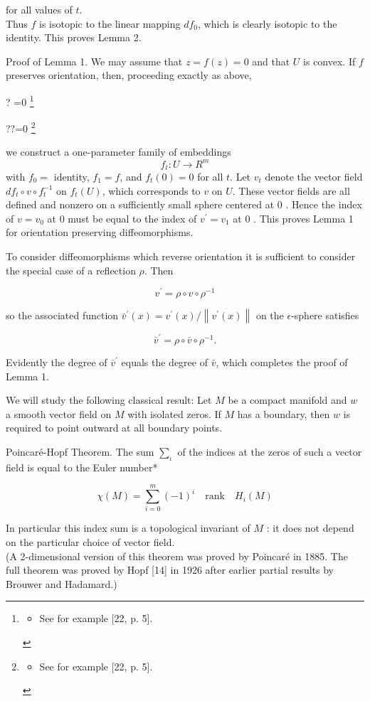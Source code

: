 \documentclass[10pt, letterpaper]{article}
\let\svthefootnote\thefootnote
\newcommand\blfootnotetext[1]{%
  \let\thefootnote\relax\footnote{#1}%
  \addtocounter{footnote}{-1}%
  \let\thefootnote\svthefootnote%
}
\let\svfootnotetext\footnotetext
\renewcommand\footnotetext[2][?]{%
  \if\relax#1\relax%
    \ifnum\value{footnote}=0\blfootnotetext{#2}\else\svfootnotetext{#2}\fi%
  \else%
    \if?#1\ifnum\value{footnote}=0\blfootnotetext{#2}\else\svfootnotetext{#2}\fi%
    \else\svfootnotetext[#1]{#2}\fi%
  \fi
}
\begin{document}
for all values of $t$.\\
Thus $f$ is isotopic to the linear mapping $d f_{0}$, which is clearly isotopic to the identity. This proves Lemma 2.

Proof of Lemma 1. We may assume that $z=f(z)=0$ and that $U$ is convex. If $f$ preserves orientation, then, proceeding exactly as above,

\footnotetext{\begin{itemize}
  \item See for example [22, p. 5].
\end{itemize}
}
we construct a one-parameter family of embeddings
$$
f_{t}: U \rightarrow R^{m}
$$
with $f_{0}=$ identity, $f_{1}=f$, and $f_{t}(0)=0$ for all $t$. Let $v_{t}$ denote the vector field $d f_{t} \circ v \circ f_{t}^{-1}$ on $f_{t}(U)$, which corresponds to $v$ on $U$. These vector fields are all defined and nonzero on a sufficiently small sphere centered at 0 . Hence the index of $v=v_{0}$ at 0 must be equal to the index of $v^{\prime}=v_{1}$ at 0 . This proves Lemma 1 for orientation preserving diffeomorphisms.

To consider diffeomorphisms which reverse orientation it is sufficient to consider the special case of a reflection $\rho$. Then

$$
v^{\prime}=\rho \circ v \circ \rho^{-1}
$$

so the associated function $\bar{v}^{\prime}(x)=v^{\prime}(x) /\left\|v^{\prime}(x)\right\|$ on the $\epsilon$-sphere satisfies

$$
\bar{v}^{\prime}=\rho \circ \bar{v} \circ \rho^{-1} .
$$

Evidently the degree of $\bar{v}^{\prime}$ equals the degree of $\bar{v}$, which completes the proof of Lemma 1.

We will study the following classical result: Let $M$ be a compact manifold and $w$ a smooth vector field on $M$ with isolated zeros. If $M$ has a boundary, then $w$ is required to point outward at all boundary points.

Poincaré-Hopf Theorem. The sum $\sum_{\iota}$ of the indices at the zeros of such a vector field is equal to the Euler number*

$$
\chi(M)=\sum_{i=0}^{m}(-1)^{i} \quad \mathrm{rank} \quad H_{i}(M)
$$

In particular this index sum is a topological invariant of $M$ : it does not depend on the particular choice of vector field.\\[0pt]
(A 2-dimensional version of this theorem was proved by Poincaré in 1885. The full theorem was proved by Hopf [14] in 1926 after earlier partial results by Brouwer and Hadamard.)
\end{document}
